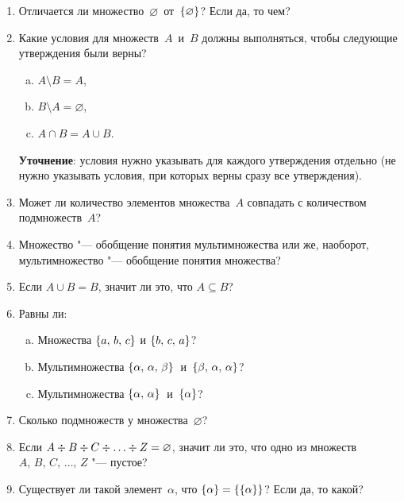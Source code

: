 \begin{enumerate}%
  \item Отличается ли множество~$\varnothing$~от~$\qty{\varnothing}$? Если да, то чем?
  \item Какие условия для множеств~$A$~и~$B$ должны выполняться, чтобы следующие утверждения были верны?
    \begin{enumerate}[a)]%
      \item $ A \setminus B = A $,
      \item $ B \setminus A = \varnothing $,
      \item $ A \cap B = A \cup B $.
    \end{enumerate}
    \textbf{Уточнение}: условия нужно указывать для каждого утверждения отдельно (не нужно указывать условия, при которых верны сразу все утверждения).
  \item Может ли количество элементов множества~$A$ совпадать с количеством подмножеств~$A$?
  \item Множество "--- обобщение понятия мультимножества или же, наоборот, мультимножество "--- обобщение понятия множества?
  \item Если $ A \cup B = B $, значит ли это, что $ A \subseteq B $?
  \item Равны ли:
    \begin{enumerate}[a)]%
      \item Множества $ \qty{a, \, b, \, c} $ и $ \qty{b, \, c, \, a} $?
      \item Мультимножества $ \qty{\alpha, \, \alpha, \, \beta} $~и~$ \qty{\beta, \, \alpha, \, \alpha} $?
      \item Мультимножества $ \qty{\alpha, \, \alpha} $~и~$ \qty{\alpha} $?
    \end{enumerate}
  \item Сколько подмножеств у множества~$\varnothing$?
  \item Если $ A \divisionsymbol B \divisionsymbol C \divisionsymbol \ldots \divisionsymbol Z = \varnothing $, значит ли это, что одно из множеств~$ A, \, B, \, C, \, \ldots, \, Z $ "--- пустое?
  \item Существует ли такой элемент~$\alpha$, что $ \qty{\alpha} = \qty{\qty{\alpha}} $? Если да, то какой?
\end{enumerate}